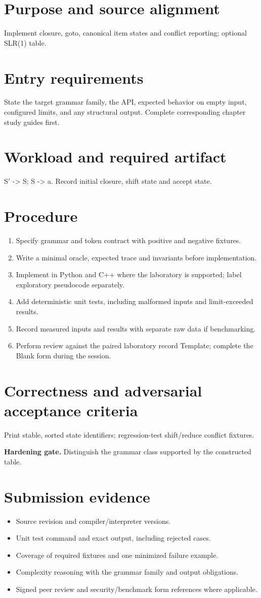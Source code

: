 \documentclass[11pt,letterpaper]{article}
\begin{document}
\makedoctitle\makedocsummary
\tableofcontents\clearpage
\section{Purpose and source alignment}
Implement closure, goto, canonical item states and conflict reporting; optional SLR(1) table.
\section{Entry requirements}
State the target grammar family, the API, expected behavior on empty input, configured limits, and any structural output. Complete corresponding chapter study guides first.
\section{Workload and required artifact}
S\ensuremath{'} -> S; S -> a. Record initial closure, shift state and accept state.
\section{Procedure}
\begin{enumerate}\item Specify grammar and token contract with positive and negative fixtures.\item Write a minimal oracle, expected trace and invariants before implementation.\item Implement in Python and C++ where the laboratory is supported; label exploratory pseudocode separately.\item Add deterministic unit tests, including malformed inputs and limit-exceeded results.\item Record measured inputs and results with separate raw data if benchmarking.\item Perform review against the paired laboratory record Template; complete the Blank form during the session.\end{enumerate}
\section{Correctness and adversarial acceptance criteria}
Print stable, sorted state identifiers; regression-test shift/reduce conflict fixtures.\par\textbf{Hardening gate.} Distinguish the grammar class supported by the constructed table.
\section{Submission evidence}
\begin{itemize}\item Source revision and compiler/interpreter versions.\item Unit test command and exact output, including rejected cases.\item Coverage of required fixtures and one minimized failure example.\item Complexity reasoning with the grammar family and output obligations.\item Signed peer review and security/benchmark form references where applicable.\end{itemize}
\end{document}
